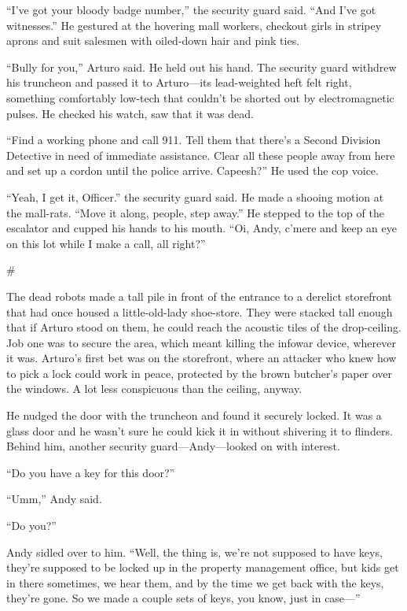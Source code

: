 “I’ve got your bloody badge number,” the security guard said. “And
I’ve got witnesses.” He gestured at the hovering mall workers,
checkout girls in stripey aprons and suit salesmen with oiled-down
hair and pink ties.

“Bully for you,” Arturo said. He held out his hand. The security
guard withdrew his truncheon and passed it to Arturo—its
lead-weighted heft felt right, something comfortably low-tech that
couldn’t be shorted out by electromagnetic pulses. He checked his
watch, saw that it was dead.

“Find a working phone and call 911. Tell them that there’s a Second
Division Detective in need of immediate assistance. Clear all these
people away from here and set up a cordon until the police arrive.
Capeesh?” He used the cop voice.

“Yeah, I get it, Officer.” the security guard said. He made a
shooing motion at the mall-rats. “Move it along, people, step
away.” He stepped to the top of the escalator and cupped his hands
to his mouth. “Oi, Andy, c’mere and keep an eye on this lot while I
make a call, all right?”

\#

The dead robots made a tall pile in front of the entrance to a
derelict storefront that had once housed a little-old-lady
shoe-store. They were stacked tall enough that if Arturo stood on
them, he could reach the acoustic tiles of the drop-ceiling. Job
one was to secure the area, which meant killing the infowar device,
wherever it was. Arturo’s first bet was on the storefront, where an
attacker who knew how to pick a lock could work in peace, protected
by the brown butcher’s paper over the windows. A lot less
conspicuous than the ceiling, anyway.

He nudged the door with the truncheon and found it securely locked.
It was a glass door and he wasn’t sure he could kick it in without
shivering it to flinders. Behind him, another security
guard—Andy—looked on with interest.

“Do you have a key for this door?”

“Umm,” Andy said.

“Do you?”

Andy sidled over to him. “Well, the thing is, we’re not supposed to
have keys, they’re supposed to be locked up in the property
management office, but kids get in there sometimes, we hear them,
and by the time we get back with the keys, they’re gone. So we made
a couple sets of keys, you know, just in case—”


